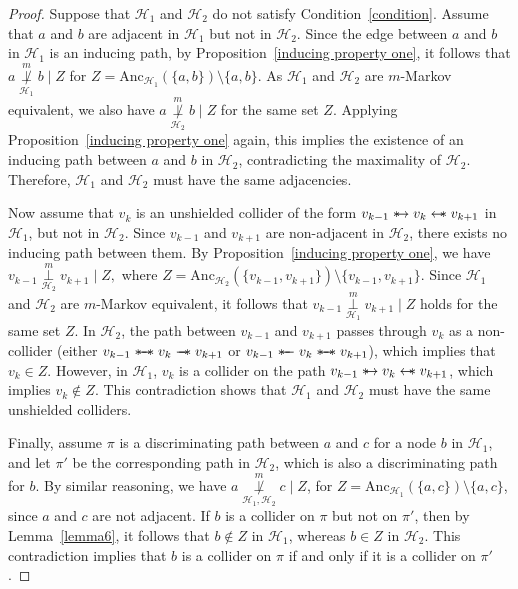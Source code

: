 \documentclass[accepted]{uai2025} %
\newcommand{\anc}{\text{Anc}}
\newcommand{\hus}{\mathrel{{\leftarrow\mkern-11mu\ast}}}
\newcommand{\suh}{\mathrel{{\ast\mkern-11mu\to}}}
\newcommand{\sut}{\mathrel{{\ast\mkern-11mu\relbar\mkern-9mu\relbar}}}
\newcommand{\tus}{\mathrel{{\relbar\mkern-11mu\relbar\mkern-11mu\ast}}}
\newcommand{\sus}{\mathrel{{\ast\mkern-11mu\relbar\mkern-9mu\relbar\mkern-11mu\ast}}}
\begin{document}
\thmthreea*
\begin{proof}
Suppose that $\mathcal{H}_1$ and $\mathcal{H}_2$ do not satisfy Condition~\ref{condition}. Assume that $a$ and $b$ are adjacent in $\mathcal{H}_1$ but not in $\mathcal{H}_2$. Since the edge between $a$ and $b$ in $\mathcal{H}_1$ is an inducing path, by Proposition~\ref{inducing property one}, it follows that $a \overset{m}{\underset{\mathcal{H}_1}{\not\perp}} b \mid Z$ for $Z = \anc_{\mathcal{H}_1}(\{a,b\}) \setminus \{a,b\}$. As $\mathcal{H}_1$ and $\mathcal{H}_2$ are $m$-Markov equivalent, we also have $a \overset{m}{\underset{\mathcal{H}_2}{\not\perp}} b \mid Z$ for the same set $Z$. Applying Proposition~\ref{inducing property one} again, this implies the existence of an inducing path between $a$ and $b$ in $\mathcal{H}_2$, contradicting the maximality of $\mathcal{H}_2$. Therefore, $\mathcal{H}_1$ and $\mathcal{H}_2$ must have the same adjacencies.

Now assume that \( v_k \) is an unshielded collider of the form \( v_{k-1} \suh v_k \hus v_{k+1} \) in \( \mathcal{H}_1 \), but not in \( \mathcal{H}_2 \). Since \( v_{k-1} \) and \( v_{k+1} \) are non-adjacent in \( \mathcal{H}_2 \), there exists no inducing path between them. By Proposition~\ref{inducing property one}, we have \(v_{k-1} \overset{m}{\underset{\mathcal{H}_2}{\perp}} v_{k+1} \mid Z,\) where \( Z = \anc_{\mathcal{H}_2}(\{v_{k-1}, v_{k+1}\}) \setminus \{v_{k-1}, v_{k+1}\} \). Since \( \mathcal{H}_1 \) and \( \mathcal{H}_2 \) are \( m \)-Markov equivalent, it follows that \(v_{k-1} \overset{m}{\underset{\mathcal{H}_1}{\perp}} v_{k+1} \mid Z\) holds for the same set \( Z \). In \( \mathcal{H}_2 \), the path between \( v_{k-1} \) and \( v_{k+1} \) passes through \( v_k \) as a non-collider (either \( v_{k-1} \sus v_k \tus v_{k+1} \) or \( v_{k-1} \sut v_k \sus v_{k+1} \)), which implies that \( v_k \in Z \). However, in \( \mathcal{H}_1 \), \( v_k \) is a collider on the path \( v_{k-1} \suh v_k \hus v_{k+1} \), which implies \( v_k \notin Z \). This contradiction shows that \( \mathcal{H}_1 \) and \( \mathcal{H}_2 \) must have the same unshielded colliders.

Finally, assume \( \pi \) is a discriminating path between \( a \) and \( c \) for a node \( b \) in \( \mathcal{H}_1 \), and let \( \pi' \) be the corresponding path in \( \mathcal{H}_2 \), which is also a discriminating path for \( b \). By similar reasoning, we have $a \overset{m}{\underset{\mathcal{H}_1,\mathcal{H}_2}{\not\perp}} c \mid Z$, for \( Z = \anc_{\mathcal{H}_1}(\{a, c\}) \setminus \{a, c\} \), since \( a \) and \( c \) are not adjacent. If \( b \) is a collider on \( \pi \) but not on \( \pi' \), then by Lemma~\ref{lemma6}, it follows that \( b \notin Z \) in \( \mathcal{H}_1 \), whereas \( b \in Z \) in \( \mathcal{H}_2 \). This contradiction implies that \( b \) is a collider on \( \pi \) if and only if it is a collider on \( \pi' \).
\end{proof}
\end{document}
